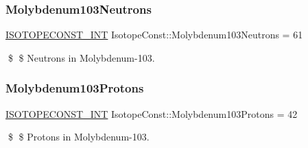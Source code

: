 \subsubsection{\texorpdfstring{Molybdenum103\+Neutrons}{Molybdenum103Neutrons}}
{\footnotesize\ttfamily \mbox{\hyperlink{group___isotope_const-_macros_ga5f18360b3e99483a35c32d789e62621c}{I\+S\+O\+T\+O\+P\+E\+C\+O\+N\+S\+T\+\_\+\+I\+NT}} Isotope\+Const\+::\+Molybdenum103\+Neutrons = 61}

\$ \$ Neutrons in Molybdenum-\/103. \mbox{\label{group___isotope_const-_molybdenum-_mo103_ga02adeefde4c653d647358e2159ed344b}} 
\subsubsection{\texorpdfstring{Molybdenum103\+Protons}{Molybdenum103Protons}}
{\footnotesize\ttfamily \mbox{\hyperlink{group___isotope_const-_macros_ga5f18360b3e99483a35c32d789e62621c}{I\+S\+O\+T\+O\+P\+E\+C\+O\+N\+S\+T\+\_\+\+I\+NT}} Isotope\+Const\+::\+Molybdenum103\+Protons = 42}

\$ \$ Protons in Molybdenum-\/103. 